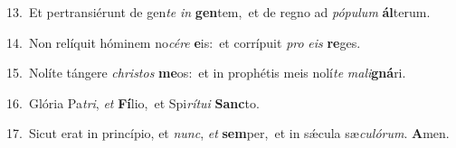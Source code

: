 {\numbfont\textcolor{\numbcolor}{13.}}~Et pertransiérunt de gen\textit{te} \textit{in} \textbf{gen}\-tem,~\star et de regno ad \textit{pó}\-\textit{pu}\textit{lum} \textbf{ál}\-terum.\par
{\numbfont\textcolor{\numbcolor}{14.}}~Non relíquit hóminem no\-\textit{cé}\-\textit{re} \textbf{e}\-is:~\star et corrípuit \textit{pro} \textit{e}\-\textit{is} \textbf{re}\-ges.\par
{\numbfont\textcolor{\numbcolor}{15.}}~Nolíte tángere \textit{chris}\-\textit{tos} \textbf{me}\-os:~\star et in prophétis meis nolí\textit{te} \textit{ma}\-\textit{li}\textbf{gná}ri.\par
{\numbfont\textcolor{\numbcolor}{16.}}~Glória Pa\-\textit{tri}\-, \textit{et} \textbf{Fí}\-lio,~\star et Spi\-\textit{rí}\-\textit{tu}\textit{i} \textbf{Sanc}\-to.\par
{\numbfont\textcolor{\numbcolor}{17.}}~Sicut erat in princípio, et \textit{nunc}\-, \textit{et} \textbf{sem}\-per,~\star et in sǽcula sæ\-\textit{cu}\-\textit{ló}\textit{rum}. \textbf{A}\-men.\par
